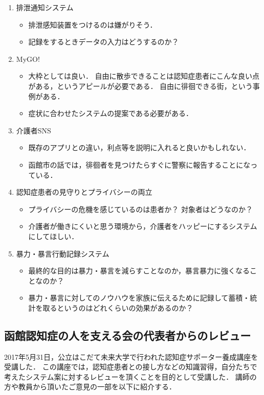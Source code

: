 \documentclass[../report]{subfiles}
\begin{document}
\begin{enumerate}
    \item[] 排泄通知システム
\begin{itemize}
    \item 排泄感知装置をつけるのは嫌がりそう．
    \item 記録をするときデータの入力はどうするのか？
\end{itemize}

    \item[] MyGO!
\begin{itemize}
    \item 大枠としては良い．
自由に散歩できることは認知症患者にこんな良い点がある，というアピールが必要である．
自由に徘徊できる街，という事例がある\cite{haikai}．
    \item 症状に合わせたシステムの提案である必要がある．
\end{itemize}

    \item[] 介護者SNS
\begin{itemize}
    \item 既存のアプリとの違い，利点等を説明に入れると良いかもしれない．
    \item 函館市の話では，徘徊者を見つけたらすぐに警察に報告することになっている．
\end{itemize}

    \item[] 認知症患者の見守りとプライバシーの両立
\begin{itemize}
    \item プライバシーの危機を感じているのは患者か？
対象者はどうなのか？
    \item 介護者が働きにくいと思う環境から，介護者をハッピーにするシステムにしてほしい．
\end{itemize}

    \item[] 暴力・暴言行動記録システム
\begin{itemize}
    \item 最終的な目的は暴力・暴言を減らすことなのか，暴言暴力に強くなることなのか？
    \item 暴力・暴言に対してのノウハウを家族に伝えるために記録して蓄積・統計を取るというのはどれくらいの効果があるのか？
\end{itemize}
\end{enumerate}


\subsection{函館認知症の人を支える会の代表者からのレビュー} \label{sec:4_hyouka_before2}
2017年5月31日，公立はこだて未来大学で行われた認知症サポーター養成講座を受講した．
この講座では，認知症患者との接し方などの知識習得，自分たちで考えたシステム案に対するレビューを頂くことを目的として受講した．
講師の方や教員から頂いたご意見の一部を以下に紹介する．
\end{document}
